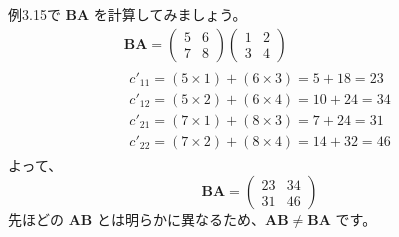 \begin{ex}[交換法則が成り立たない例]
例3.15で $\bm{B}\bm{A}$ を計算してみましょう。
\begin{gather*}
\bm{B}\bm{A} = \begin{pmatrix} 5 & 6 \\ 7 & 8 \end{pmatrix} \begin{pmatrix} 1 & 2 \\ 3 & 4 \end{pmatrix}\\
\begin{aligned}
c'_{11} = (5 \times 1) + (6 \times 3) = 5 + 18 = 23\\
c'_{12} = (5 \times 2) + (6 \times 4) = 10 + 24 = 34\\
c'_{21} = (7 \times 1) + (8 \times 3) = 7 + 24 = 31\\
c'_{22} = (7 \times 2) + (8 \times 4) = 14 + 32 = 46
\end{aligned}
\end{gather*}
よって、
\[\bm{B}\bm{A} = \begin{pmatrix} 23 & 34 \\ 31 & 46 \end{pmatrix}\]
先ほどの $\bm{A}\bm{B}$ とは明らかに異なるため、$\bm{A}\bm{B} \neq \bm{B}\bm{A}$ です。
\end{ex}

